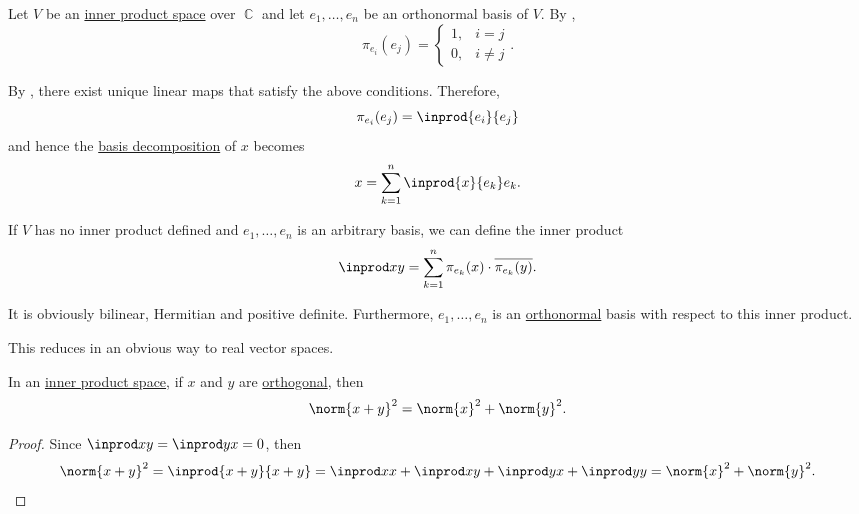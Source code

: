 \begin{remark}\label{rem:inner_product_basis_decomposition}
  Let \( V \) be an \hyperref[def:inner_product_space]{inner product space} over \( \BbbC \) and let \( e_1, \ldots, e_n \) be an orthonormal basis of \( V \). By ,
  \begin{equation*}
    \pi_{e_i}(e_j) = \begin{cases}
      1, &i = j \\
      0, &i \neq j
    \end{cases}.
  \end{equation*}

  By , there exist unique linear maps that satisfy the above conditions. Therefore,
  \begin{equation*}
    \pi_{e_i}(e_j) = \inprod {e_i} {e_j}
  \end{equation*}
  and hence the \hyperref[def:basis_decomposition]{basis decomposition} of \( x \) becomes
  \begin{equation}\label{eq:rem:inner_product_basis_decomposition/decomposition}
    x = \sum_{k=1}^n \inprod {x} {e_k} e_k.
  \end{equation}

  If \( V \) has no inner product defined and \( e_1, \ldots, e_n \) is an arbitrary basis, we can define the inner product
  \begin{equation}\label{eq:rem:inner_product_basis_decomposition/product}
    \inprod x y = \sum_{k=1}^n \pi_{e_k}(x) \cdot \overline{\pi_{e_k}(y)}.
  \end{equation}

  It is obviously bilinear, Hermitian and positive definite. Furthermore, \( e_1, \ldots, e_n \) is an \hyperref[def:orthogonality]{orthonormal} basis with respect to this inner product.

  This reduces in an obvious way to real vector spaces.
\end{remark}

\begin{theorem}\label{thm:pythagoras_theorem}
  In an \hyperref[def:inner_product_space]{inner product space}, if \( x \) and \( y \) are \hyperref[def:orthogonality]{orthogonal}, then
  \begin{equation*}
    \norm{x + y}^2 = \norm{x}^2 + \norm{y}^2.
  \end{equation*}
\end{theorem}
\begin{proof}
  Since \( \inprod x y = \inprod y x = 0 \), then
  \begin{equation*}
    \norm{x + y}^2
    =
    \inprod {x + y} {x + y}
    =
    \inprod x x + \inprod x y + \inprod y x + \inprod y y
    =
    \norm{x}^2 + \norm{y}^2.
  \end{equation*}
\end{proof}

